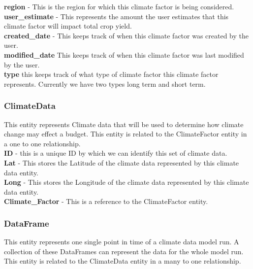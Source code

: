 \documentclass[onecolumn, draftclsnofoot,10pt, compsoc]{article}
\begin{document}
					\textbf{region} - This is the region for which this climate factor is being considered.\\

					\textbf{user\_estimate} - This represents the amount the user estimates that this climate factor will impact total crop yield.\\

					\textbf{created\_date} - This keeps track of when this climate factor was created by the user.\\

					\textbf{modified\_date} \- This keeps track of when this climate factor was last modified by the user.\\

					\textbf{type} \- this keeps track of what type of climate factor this climate factor represents. Currently we have two types long term and short term.\\

				\subsubsection{ClimateData}
					This entity represents Climate data that will be used to determine how climate change may effect a budget. This entity is related to the ClimateFactor entity in a one to one relationship.\\

					\textbf{ID} - this is a unique ID by which we can identify this set of climate data.\\

					\textbf{Lat} - This stores the Latitude of the climate data represented by this climate data entity.\\

					\textbf{Long} - This stores the Longitude of the climate data represented by this climate data entity.\\

					\textbf{Climate\_Factor} - This is a reference to the ClimateFactor entity.\\

				\subsubsection{DataFrame}
					This entity represents one single point in time of a climate data model run. A collection of these DataFrames can represent the data for the whole model run. This entity is related to the ClimateData entity in a many to one relationship.\\
\end{document}
